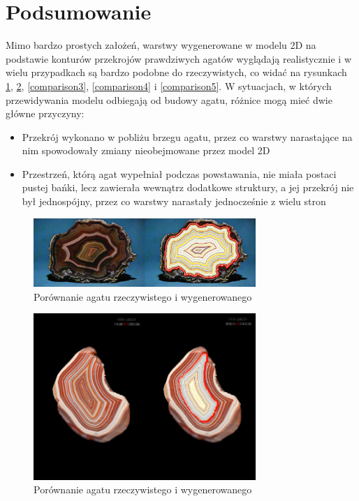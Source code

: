 \documentclass{article}
\begin{document}
\section{Podsumowanie}
Mimo bardzo prostych założeń, warstwy wygenerowane w modelu 2D na podstawie konturów przekrojów prawdziwych agatów wyglądają realistycznie i w wielu przypadkach są bardzo podobne do rzeczywistych, co widać na rysunkach \ref{comparison1}, \ref{comparison2}, \ref{comparison3}, \ref{comparison4} i \ref{comparison5}. W sytuacjach, w których przewidywania modelu odbiegają od budowy agatu, różnice mogą mieć dwie główne przyczyny:
\begin{itemize}
\item Przekrój wykonano w pobliżu brzegu agatu, przez co warstwy narastające na nim spowodowały zmiany nieobejmowane przez model 2D
\item Przestrzeń, którą agat wypełniał podczas powstawania, nie miała postaci pustej bańki, lecz zawierała wewnątrz dodatkowe struktury, a jej przekrój nie był jednospójny, przez co warstwy narastały jednocześnie z wielu stron
\end{itemize}
\begin{figure}[H]
\caption{Porównanie agatu rzeczywistego i wygenerowanego}
\label{comparison1}
\centering
\includegraphics[width=0.75\textwidth]{obrazy/comparison/1.png}
\end{figure}
\begin{figure}[H]
\caption{Porównanie agatu rzeczywistego i wygenerowanego}
\label{comparison2}
\centering
\includegraphics[width=0.75\textwidth]{obrazy/comparison/2.png}
\end{figure}
\end{document}
